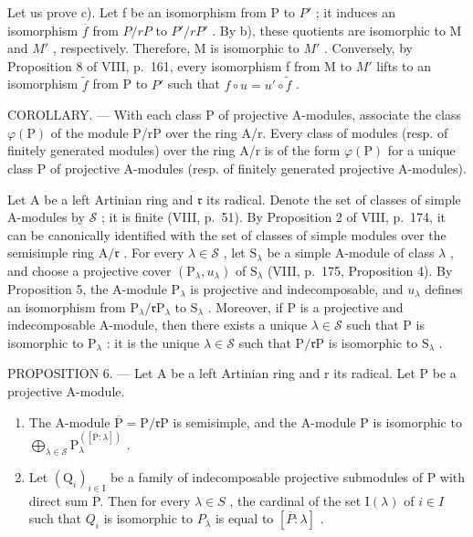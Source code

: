 Let us prove c). Let f be an isomorphism from P to \(P'\) ; it induces an isomorphism \(\overline{f}\) from \(P/rP\) to \(P'/rP'\) . By b), these quotients are isomorphic to M and \(M'\) , respectively. Therefore, M is isomorphic to \(M'\) . Conversely, by Proposition 8 of VIII, p.~161, every isomorphism f from M to \(M'\) lifts to an isomorphism \(\widetilde{f}\) from P to \(P'\) such that \(f \circ u = u' \circ \widetilde{f}\) .

COROLLARY. --- With each class P of projective A-modules, associate the class \(\varphi(\mathrm{P})\) of the module P/rP over the ring A/r. Every class of modules (resp. of finitely generated modules) over the ring A/r is of the form \(\varphi(\mathrm{P})\) for a unique class P of projective A-modules (resp. of finitely generated projective A-modules).

Let A be a left Artinian ring and \(\mathfrak{r}\) its radical. Denote the set of classes of simple A-modules by \(\mathcal{S}\) ; it is finite (VIII, p.~51). By Proposition 2 of VIII, p.~174, it can be canonically identified with the set of classes of simple modules over the semisimple ring \(\mathrm{A} / \mathfrak{r}\) . For every \(\lambda \in \mathcal{S}\) , let \(\mathrm{S}_{\lambda}\) be a simple A-module of class \(\lambda\) , and choose a projective cover \((\mathrm{P}_{\lambda}, u_{\lambda})\) of \(\mathrm{S}_{\lambda}\) (VIII, p.~175, Proposition 4). By Proposition 5, the A-module \(\mathrm{P}_{\lambda}\) is projective and indecomposable, and \(u_{\lambda}\) defines an isomorphism from \(\mathrm{P}_{\lambda} / \mathfrak{r}\mathrm{P}_{\lambda}\) to \(\mathrm{S}_{\lambda}\) . Moreover, if P is a projective and indecomposable A-module, then there exists a unique \(\lambda \in \mathcal{S}\) such that P is isomorphic to \(\mathrm{P}_{\lambda}\) : it is the unique \(\lambda \in \mathcal{S}\) such that \(\mathrm{P} / \mathfrak{r}\mathrm{P}\) is isomorphic to \(\mathrm{S}_{\lambda}\) .

PROPOSITION 6. --- Let A be a left Artinian ring and r its radical. Let P be a projective A-module.

\begin{enumerate}
\def\labelenumi{\alph{enumi})}
\item
  The A-module \(\overline{\mathrm{P}} = \mathrm{P} / \mathfrak{r}\mathrm{P}\) is semisimple, and the A-module \(\mathrm{P}\) is isomorphic to \(\bigoplus_{\lambda \in \mathcal{S}}\mathrm{P}_{\lambda}^{([\overline{\mathrm{P}}:\lambda ])}\) .
\item
  Let \((\mathrm{Q}_{i})_{i\in\mathrm{I}}\) be a family of indecomposable projective submodules of P with direct sum P. Then for every \(\lambda\in S\) , the cardinal of the set \(\mathrm{I}(\lambda)\) of \(i\in I\) such that \(Q_{i}\) is isomorphic to \(P_{\lambda}\) is equal to \([\overline{P}:\lambda]\) .
\end{enumerate}

